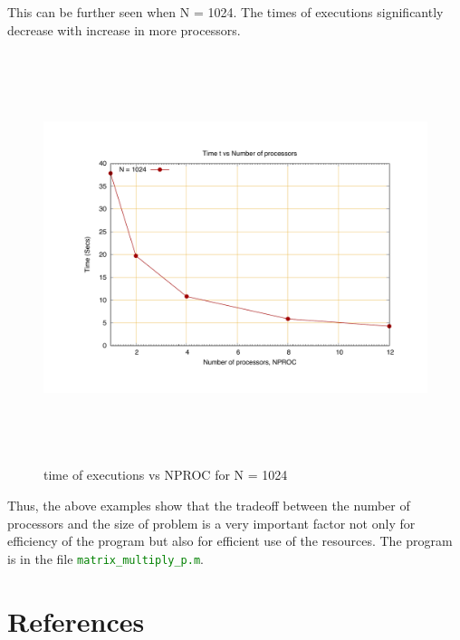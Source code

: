 \documentclass[fleqn,letterpaper,12pt]{report}
\begin{document}
\newpage
This can be further seen when N = 1024. The times of executions significantly decrease with increase in more processors.
\begin{figure}[!h]
	\centering
	\includegraphics[height=120mm,width=160mm]{1024.pdf}
	\caption{time of executions vs NPROC for N = 1024\label{overflow}}
\end{figure}

Thus, the above examples show that the tradeoff between the number of processors and the size of problem is a very important factor not only for efficiency of the program but also for efficient use of the resources. The program is in the file {\tt\textcolor{Green}{matrix\_multiply\_p.m}}.
\vfill

\newpage
{}
\section*{References}


\end{document}
